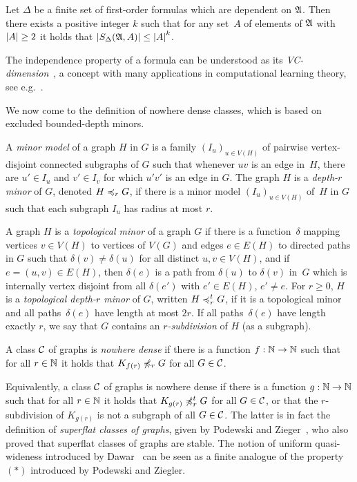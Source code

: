 \begin{theorem}
Let $\Delta$ be a finite set of first-order formulas which are 
dependent on $\mathfrak{A}$. Then there exists a positive integer $k$ such that 
for any set~$A$ of elements of $\mathfrak{A}$ with $\left\lvert A\right\rvert\geq 2$ it holds that
$\left\lvert S_\Delta(\mathfrak{A},A)\right\rvert\leq \left\lvert A\right\rvert^k$. 
\end{theorem}

The independence property of a formula can be understood as its 
\emph{VC-dimension}~\cite{vapnik2015uniform,laskowski1992vapnik}, 
a concept with many applications in computational
learning theory, see e.g.~\cite{}. 

We now come to the definition of nowhere dense classes, which is based
on excluded bounded-depth minors. 

\begin{definition}
A {\em{minor model}} of a graph $H$ in $G$ is a family $(I_u)_{u\in V(H)}$ of pairwise vertex-disjoint connected subgraphs of $G$
such that whenever $uv$ is an edge in~$H$, there are $u'\in I_u$ and $v'\in I_v$ for which $u'v'$ 
is an edge in $G$.
The graph $H$ is a {\em{depth-$r$ minor}} of $G$, denoted $H\preccurlyeq_rG$, if there is a minor model
$(I_u)_{u\in V(H)}$ of~$H$ in $G$ such that each subgraph $I_u$ has radius at most $r$.

A graph $H$ is a \emph{topological minor} of a graph $G$ if there is a
function~$\delta$ mapping vertices $v\in V(H)$ to vertices of $V(G)$ and 
edges $e\in E(H)$ to directed paths in $G$ such that 
$\delta(v)\neq \delta(u)$ for all distinct $u,v\in V(H)$, and 
if $e=(u,v)\in E(H)$, then $\delta(e)$ is a path from 
$\delta(u)$ to $\delta(v)$ in~$G$ which is internally vertex disjoint from all 
$\delta(e')$ with $e'\in E(H)$, $e'\neq e$. 
For $r\geq 0$, $H$ is a \emph{topological depth-$r$ minor} of $G$, 
written $H\preccurlyeq_r^tG$, if it is a topological minor and all paths~$\delta(e)$
have length at most $2r$. If all paths~$\delta(e)$ have length exactly
$r$, we say that $G$ contains an \emph{$r$-subdivision} of $H$ (as a 
subgraph). 
\end{definition}

\begin{definition}
A class $\mathcal{C}$ of graphs is \emph{nowhere dense} if there is a function 
$f:\mathbb{N}\rightarrow \mathbb{N}$ such that for all $r\in \mathbb{N}$ it holds that $K_{f(r)}\not\preccurlyeq_r G$
for all $G\in \mathcal{C}$. 
\end{definition}

Equivalently, a 
class $\mathcal{C}$ of graphs is nowhere dense if there is a function 
$g:\mathbb{N}\rightarrow \mathbb{N}$ such that for all $r\in \mathbb{N}$ it holds that 
$K_{g(r)}\not\preccurlyeq_r^t G$ for all $G\in \mathcal{C}$, or that the
$r$-subdivision of $K_{g(r)}$ is not a subgraph of all $G\in \mathcal{C}$. 
The latter is in fact the definition of \emph{superflat classes of graphs}, 
given by Podewski and Zieger~\cite{podewski1978stable}, who also
proved that superflat classes of graphs are stable. 
The notion of uniform
quasi-wideness introduced by Dawar~\cite{dawar2010homomorphism}
can be seen as a finite analogue of the property 
$(\ast)$ introduced by Podewski and Ziegler. 

